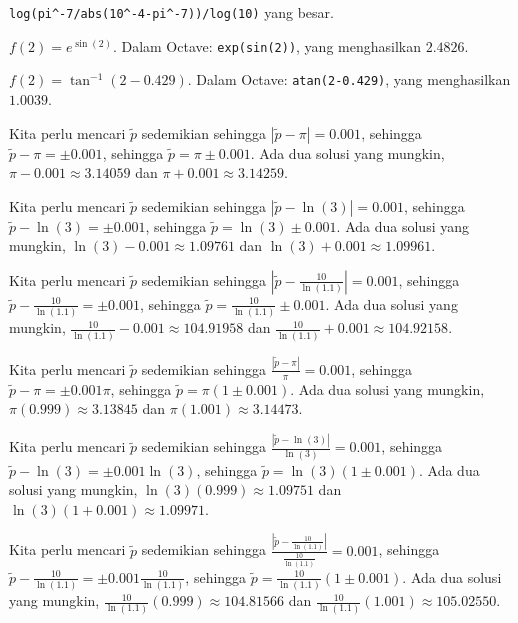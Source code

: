 \begin{description}
\begin{center}
\texttt{log(pi\textasciicircum -7/abs(10\textasciicircum -4-pi\textasciicircum -7))/log(10)}
yang besar.
\par\end{center}
\item [{\ref{exc:abserr12}:}] $f(2)=e^{\sin(2)}$. Dalam Octave: \texttt{exp(sin(2))},
yang menghasilkan $2.4826$.
\item [{\ref{exc:abserr13}:}] $f(2)=\tan^{-1}(2-0.429)$. Dalam Octave:
\texttt{atan(2-0.429)}, yang menghasilkan $1.0039$.
\item [{\ref{exc:abserr4}:}] Kita perlu mencari $\tilde{p}$ sedemikian
sehingga $|\tilde{p}-\pi|=0.001$, sehingga $\tilde{p}-\pi=\pm0.001$,
sehingga $\tilde{p}=\pi\pm0.001$. Ada dua solusi yang mungkin, $\pi-0.001\approx3.14059$
dan $\pi+0.001\approx3.14259$.
\item [{\ref{exc:abserr5}:}] Kita perlu mencari $\tilde{p}$ sedemikian
sehingga $|\tilde{p}-\ln(3)|=0.001$, sehingga $\tilde{p}-\ln(3)=\pm0.001$,
sehingga $\tilde{p}=\ln(3)\pm0.001$. Ada dua solusi yang mungkin,
$\ln(3)-0.001\approx1.09761$ dan $\ln(3)+0.001\approx1.09961$.
\item [{\ref{exc:abserr6}:}] Kita perlu mencari $\tilde{p}$ sedemikian
sehingga $\left|\tilde{p}-\frac{10}{\ln(1.1)}\right|=0.001$, sehingga
$\tilde{p}-\frac{10}{\ln(1.1)}=\pm0.001$, sehingga $\tilde{p}=\frac{10}{\ln(1.1)}\pm0.001$.
Ada dua solusi yang mungkin, $\frac{10}{\ln(1.1)}-0.001\approx104.91958$
dan $\frac{10}{\ln(1.1)}+0.001\approx104.92158$.
\item [{\ref{exc:abserr17}a:}] Kita perlu mencari $\tilde{p}$ sedemikian
sehingga $\frac{|\tilde{p}-\pi|}{\pi}=0.001$, sehingga $\tilde{p}-\pi=\pm0.001\pi$,
sehingga $\tilde{p}=\pi(1\pm0.001)$. Ada dua solusi yang mungkin,
$\pi(0.999)\approx3.13845$ dan $\pi(1.001)\approx3.14473$.
\item [{\ref{exc:abserr17}c:}] Kita perlu mencari $\tilde{p}$ sedemikian
sehingga $\frac{|\tilde{p}-\ln(3)|}{\ln(3)}=0.001$, sehingga $\tilde{p}-\ln(3)=\pm0.001\ln(3)$,
sehingga $\tilde{p}=\ln(3)(1\pm0.001)$. Ada dua solusi yang mungkin,
$\ln(3)(0.999)\approx1.09751$ dan $\ln(3)(1+0.001)\approx1.09971$.
\item [{\ref{exc:abserr17}e:}] Kita perlu mencari $\tilde{p}$ sedemikian
sehingga $\frac{\left|\tilde{p}-\frac{10}{\ln(1.1)}\right|}{\frac{10}{\ln(1.1)}}=0.001$,
sehingga $\tilde{p}-\frac{10}{\ln(1.1)}=\pm0.001\frac{10}{\ln(1.1)}$,
sehingga $\tilde{p}=\frac{10}{\ln(1.1)}(1\pm0.001)$. Ada dua solusi
yang mungkin, $\frac{10}{\ln(1.1)}(0.999)\approx104.81566$ dan $\frac{10}{\ln(1.1)}(1.001)\approx105.02550$.
\end{description}

